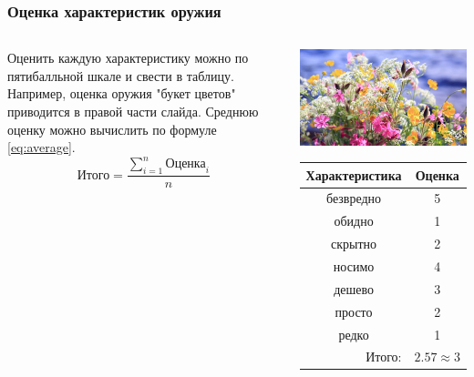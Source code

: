 \begin{frame}
    \frametitle{Оценка характеристик оружия}

    \begin{columns}
            Оценить каждую характеристику можно по пятибалльной шкале и свести в таблицу. Например, оценка оружия \alert{"букет цветов"} приводится в правой части слайда. Среднюю оценку можно вычислить по формуле \eqref{eq:average}. 
            \begin{equation}
                \label{eq:average}
                \text{Итого}=\frac{\displaystyle\sum_{i=1}^{n}\text{Оценка}_i}{n}
            \end{equation}
            
            
            \begin{center}
                \includegraphics[width=.4\textheight]{fig/flowers}
                
                \begin{tabular}{c|c}
                    \hline\hline
                    Характеристика              & Оценка\\ \hline\hline
                    безвредно                   & 5 \\
                    обидно                      & 1 \\
                    скрытно                     & 2 \\
                    носимо                      & 4 \\
                    дешево                      & 3 \\
                    просто                      & 2 \\ 
                    редко                       & 1 \\ \hline
                    \multicolumn{1}{r|}{Итого:} & $2.57\approx 3$ \\
                \end{tabular}
            \end{center}
    \end{columns}    
\end{frame}

